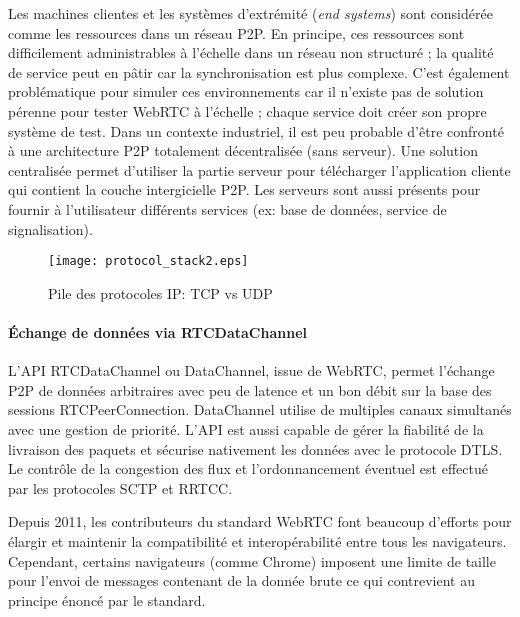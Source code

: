 Les machines clientes et les systèmes d'extrémité (\textit{end systems}) 
sont considérée comme \og les ressources\fg{} dans un réseau 
\gls{P2P}. 
En principe, ces ressources sont difficilement administrables à l'échelle 
dans un réseau non structuré ; la qualité de service peut en pâtir car la 
synchronisation est plus complexe. C'est également problématique pour simuler 
ces environnements car il n'existe pas de solution pérenne pour tester WebRTC à 
l'échelle ; chaque service doit créer son propre système de test. 
Dans un contexte industriel, il est peu probable d'être confronté à une architecture 
\gls{P2P} totalement décentralisée (sans serveur). Une solution centralisée permet 
d'utiliser la partie serveur pour télécharger l'application cliente qui contient la 
couche intergicielle \gls{P2P}. 
Les serveurs sont aussi présents pour fournir à l'utilisateur différents services (ex: 
base de données, service de signalisation). 

\begin{figure}[ht]
	\centering
	\texttt{[image: protocol\_stack2.eps]}
	\caption{Pile des protocoles IP: TCP vs UDP}
	\label{fig:protocolstack}
\end{figure}
\paragraph{Échange de données via RTCDataChannel}
L'\gls{API} RTCDataChannel ou Data\-Channel, issue de  WebRTC, 
permet l'échange \gls{P2P} de données arbitraires avec peu de latence et 
un bon débit sur la base des sessions RTCPeerConnection.
DataChannel utilise de multiples canaux simultanés avec une gestion de 
priorité. L'\gls{API} est aussi capable de gérer la fiabilité de la livraison des 
paquets et sécurise nativement les données avec le protocole 
\gls{DTLS}. 
Le contrôle de la congestion des flux et l'ordonnancement éventuel est 
effectué par les protocoles \gls{SCTP} et \gls{RRTCC}. 


Depuis 2011, les contributeurs du standard WebRTC font beaucoup 
d'efforts pour élargir et maintenir la compatibilité et interopérabilité entre 
tous les navigateurs.
Cependant, certains navigateurs (comme Chrome) imposent une limite de taille 
pour l'envoi de messages contenant de la donnée brute ce qui contrevient au 
principe énoncé par le standard.


